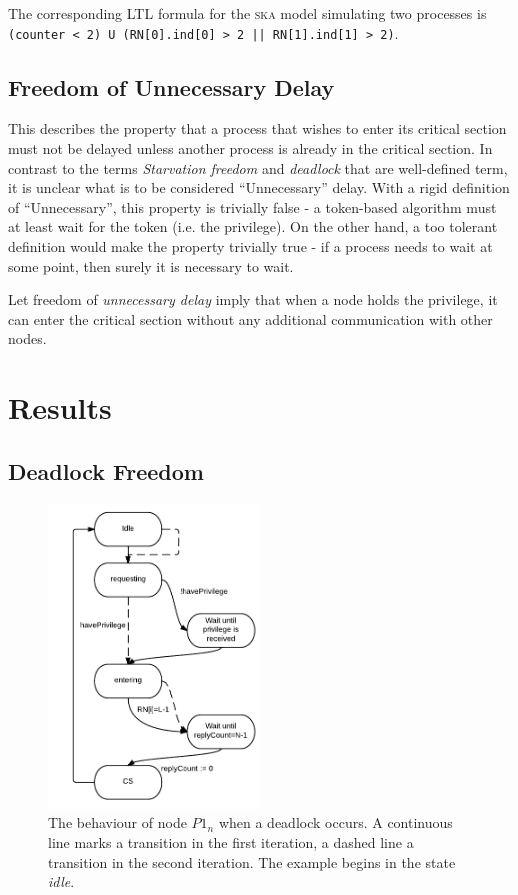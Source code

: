 \documentclass[a4paper,10pt]{llncs}
\begin{document}
The corresponding LTL formula for the \textsc{ska} model simulating two processes is \texttt{(counter < 2) U (RN[0].ind[0] > 2 || RN[1].ind[1] > 2)}.

\subsection{Freedom of Unnecessary Delay}
\label{sec:delay}

This describes the property that a process that wishes to enter its critical section must not be delayed unless another process is already in the critical section. In contrast to the terms \emph{Starvation freedom} and \emph{deadlock} that are well-defined term, it is unclear what is to be considered ``Unnecessary'' delay. With a rigid definition of ``Unnecessary'', this property is trivially false - a token-based algorithm must at least wait for the token (i.e. the privilege). On the other hand, a too tolerant definition would make the property trivially true - if a process needs to wait at some point, then surely it is necessary to wait.

Let freedom of \emph{unnecessary delay} imply that when a node holds the privilege, it can enter the critical section without any additional communication with other nodes.

\section{Results}
\subsection{Deadlock Freedom}

\begin{figure}[]
\begin{center}
\includegraphics[width=0.5\textwidth]{Deadlock.pdf}
 \caption[Close up of \textit{Hemidactylus} sp.]
   {The behaviour of node $P1_n$ when a deadlock occurs. A continuous line marks a transition in the first iteration, a dashed line a transition in the second iteration. The example begins in the state \emph{idle}.}
\end{center}
\end{figure}
\end{document}
